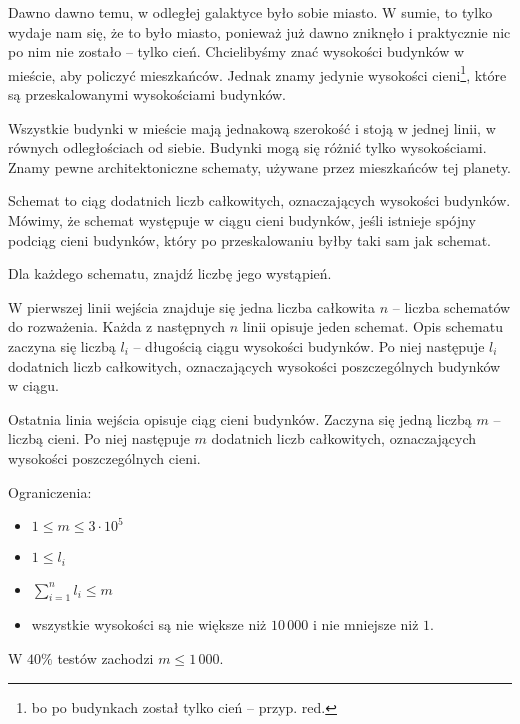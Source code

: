 

\usepackage[utf8]{inputenc}
\usepackage[T1]{fontenc}
\usepackage[polish]{babel}
\usepackage{polski}





Dawno dawno temu, w odległej galaktyce było sobie miasto.
W sumie, to tylko wydaje nam się, że to było miasto,
	ponieważ już dawno zniknęło i praktycznie nic po nim nie zostało -- tylko cień.
Chcielibyśmy znać wysokości budynków w mieście, aby policzyć mieszkańców.
Jednak znamy jedynie wysokości cieni\footnote{bo po budynkach został tylko cień -- przyp. red.},
	które są przeskalowanymi wysokościami budynków.


Wszystkie budynki w mieście mają jednakową szerokość i stoją w jednej linii, w równych odległościach od siebie.
Budynki mogą się różnić tylko wysokościami.
Znamy pewne architektoniczne schematy, używane przez mieszkańców tej planety.

Schemat to ciąg dodatnich liczb całkowitych, oznaczających wysokości budynków.
Mówimy, że schemat występuje w ciągu cieni budynków, jeśli istnieje spójny podciąg cieni budynków,
	który po przeskalowaniu byłby taki sam jak schemat.

Dla każdego schematu, znajdź liczbę jego wystąpień.


W pierwszej linii wejścia znajduje się jedna liczba całkowita $n$ -- liczba schematów do rozważenia.
Każda z następnych $n$ linii opisuje jeden schemat.
Opis schematu zaczyna się liczbą $l_i$ -- długością ciągu wysokości budynków.
Po niej następuje $l_i$ dodatnich liczb całkowitych, oznaczających wysokości poszczególnych budynków w ciągu.

Ostatnia linia wejścia opisuje ciąg cieni budynków.
Zaczyna się jedną liczbą $m$ -- liczbą cieni.
Po niej następuje $m$ dodatnich liczb całkowitych, oznaczających wysokości poszczególnych cieni.

Ograniczenia:
\begin{itemize}
	\item $1 \le m \le 3 \cdot 10^5$
	\item $1 \le l_i$
	\item $\sum_{i = 1}^n l_i \le m$
	\item wszystkie wysokości są nie większe niż $10\,000$ i nie mniejsze niż $1$.
\end{itemize}
W $40\%$ testów zachodzi $m \le 1\,000$.

